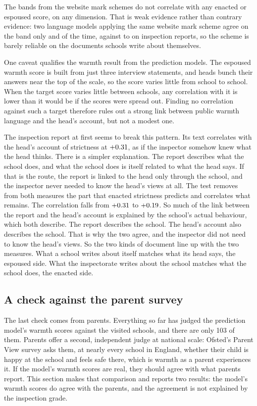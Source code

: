 The bands from the website mark schemes do not correlate with any enacted or espoused score, on any dimension. That is weak evidence rather than contrary evidence: two language models applying the same website mark scheme agree on the band only \AgreeWebW{} and \AgreeWebS{} of the time, against \AgreeOfstedW{} to \AgreeOfstedT{} on inspection reports, so the scheme is barely reliable on the documents schools write about themselves.

One caveat qualifies the warmth result from the prediction models. The espoused warmth score is built from just three interview
statements, and heads bunch their answers near the top of the scale, so the score varies little
from school to school. When the target score varies little between schools, any correlation with it is lower than it would be if the scores were spread out. Finding no correlation against such a target therefore rules out a strong link between public warmth language
and the head's account, but not a modest one.

The inspection report at first seems to break this pattern. Its text correlates with the head's account of strictness at $+0.31$, as if the inspector somehow knew what the head thinks. There is a simpler explanation. The report describes what the school does, and what the school does is itself related to what the head says. If that is the route, the report is linked to the head only through the school, and the inspector never needed to know the head's views at all. The test removes from both measures the part that enacted strictness predicts and correlates what remains. The correlation falls from $+0.31$ to $+0.19$. So much of the link between the report and the head's account is explained by the school's actual behaviour, which both describe. The report describes the school. The head's account also describes the school. That is why the two agree, and the inspector did not need to know the head's views. So the two kinds of document line up with the two measures. What a school writes about itself matches what its head says, the espoused side. What the inspectorate writes about the school matches what the school does, the enacted side.

\subsection{A check against the parent survey}
\label{sec:p1_pv}

The last check comes from parents. Everything so far has judged the prediction model's warmth scores against the visited schools, and there are only 103 of them. Parents offer a second, independent judge at national scale: Ofsted's Parent View survey asks them, at nearly every school in England, whether their child is happy at the school and feels safe there, which is warmth as a parent experiences it. If the model's warmth scores are real, they should agree with what parents report. This section makes that comparison and reports two results: the model's warmth scores do agree with the parents, and the agreement is not explained by the inspection grade.

